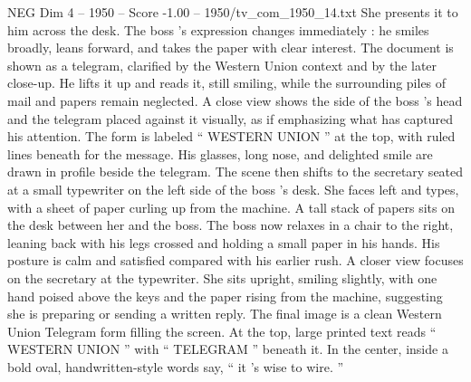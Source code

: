\begin{textsample}{NEG Dim 4 – 1950 – Score -1.00 – 1950/tv\_com\_1950\_14.txt}
She presents it to him across the desk.
The boss ’s expression changes immediately : he smiles broadly, leans forward, and takes the paper with clear interest.
The document is shown as a telegram, clarified by the Western Union context and by the later close-up.
He lifts it up and reads it, still smiling, while the surrounding piles of mail and papers remain neglected.
A close view shows the side of the boss ’s head and the telegram placed against it visually, as if emphasizing what has captured his attention.
The form is labeled “ WESTERN UNION ” at the top, with ruled lines beneath for the message.
His glasses, long nose, and delighted smile are drawn in profile beside the telegram.
The scene then shifts to the secretary seated at a small typewriter on the left side of the boss ’s desk.
She faces left and types, with a sheet of paper curling up from the machine.
A tall stack of papers sits on the desk between her and the boss.
The boss now relaxes in a chair to the right, leaning back with his legs crossed and holding a small paper in his hands.
His posture is calm and satisfied compared with his earlier rush.
A closer view focuses on the secretary at the typewriter.
She sits upright, smiling slightly, with one hand poised above the keys and the paper rising from the machine, suggesting she is preparing or sending a written reply.
The final image is a clean Western Union Telegram form filling the screen.
At the top, large printed text reads “ WESTERN UNION ” with “ TELEGRAM ” beneath it.
In the center, inside a bold oval, handwritten-style words say, “ it ’s wise to wire. ”

\end{textsample}
